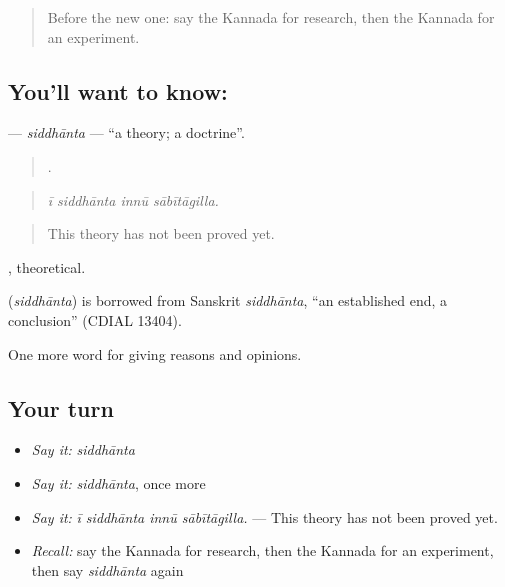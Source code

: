 \label{lesson:KA-C407-siddhanta}



\begin{quote}
Before the new one: say the Kannada for research, then the Kannada for an experiment.
\end{quote}

\subsection*{You'll want to know: }
\textbf{} — \emph{siddhānta} — \textquotedblleft{}a theory; a doctrine\textquotedblright{}.

\begin{quote}
   .
\end{quote}

\begin{quote}
\emph{ī siddhānta innū sābītāgilla.}
\end{quote}

\begin{quote}
This theory has not been proved yet.
\end{quote}

, theoretical.

\begin{cousinweb}
\textbf{} (\emph{siddhānta}) is borrowed from Sanskrit \emph{siddhānta}, \textquotedblleft{}an established end, a conclusion\textquotedblright{} (CDIAL 13404).
\end{cousinweb}

\begin{grammarlens}[title={What you've built}]
One more word for giving reasons and opinions.
\end{grammarlens}

\subsection*{Your turn}
\begin{itemize}
\raggedright
  \item \emph{Say it:} \emph{siddhānta}
  \item \emph{Say it:} \emph{siddhānta}, once more
  \item \emph{Say it:} \emph{ī siddhānta innū sābītāgilla.} — This theory has not been proved yet.
  \item \emph{Recall:} say the Kannada for research, then the Kannada for an experiment, then say \emph{siddhānta} again
\end{itemize}

